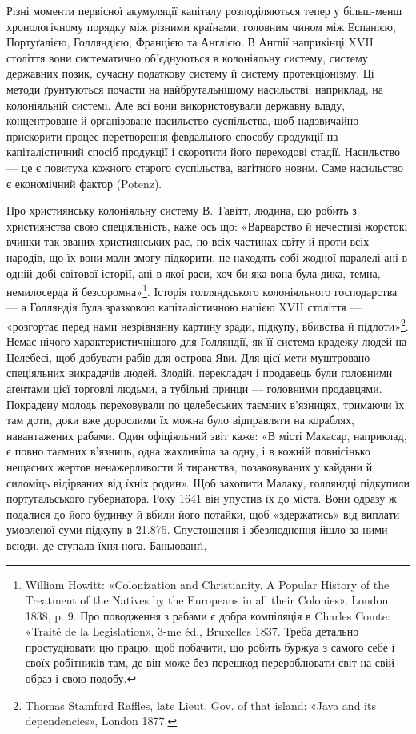 
Різні моменти первісної акумуляції капіталу розподіляються
тепер у більш-менш хронологічному порядку між різними країнами,
головним чином між Еспанією, Портуґалією, Голляндією,
Францією та Англією. В Англії наприкінці XVII століття вони
систематично об’єднуються в колоніяльну систему, систему державних
позик, сучасну податкову систему й систему протекціонізму.
Ці методи ґрунтуються почасти на найбрутальнішому
насильстві, наприклад, на колоніяльній системі. Але всі вони
використовували державну владу, концентроване й організоване
насильство суспільства, щоб надзвичайно прискорити процес
перетворення февдального способу продукції на капіталістичний
спосіб продукції і скоротити його переходові стадії. Насильство —
це є повитуха кожного старого суспільства, вагітного новим.
Саме насильство є економічний фактор (Potenz).

Про християнську колоніяльну систему В.~Гавітт, людина,
що робить з християнства свою спеціяльність, каже ось що:
«Варварство й нечестиві жорстокі вчинки так званих християнських
рас, по всіх частинах світу й проти всіх народів, що їх
вони мали змогу підкорити, не находять собі жодної паралелі
ані в одній добі світової історії, ані в якої раси, хоч би яка вона
була дика, темна, немилосерда й безсоромна»\footnote{
William Howitt: «Colonization and Christianity. A Popular History
of the Treatment of the Natives by the Europeans in all their Colonies»,
London 1838, p. 9. Про поводження з рабами є добра компіляція в Charles
Comte: «Traité de la Legislation», 3-me éd., Bruxelles 1837. Треба детально
простудіювати цю працю, щоб побачити, що робить буржуа з
самого себе і своїх робітників там, де він може без перешкод перероблювати
світ на свій образ і свою подобу.
}. Історія голляндського
колоніяльного господарства — а Голляндія була
зразковою капіталістичною нацією XVII століття — «розгортає
перед нами незрівнянну картину зради, підкупу, вбивства
й підлоти»\footnote{
Thomas Stamford Raffles, late Lieut. Gov. of that island: «Java
and its dependencies», London 1877.
}. Немає нічого характеристичнішого для Голляндії,
як її система крадежу людей на Целебесі, щоб добувати рабів
для острова Яви. Для цієї мети муштровано спеціяльних викрадачів
людей. Злодій, перекладач і продавець були головними аґентами
цієї торговлі людьми, а тубільні принци — головними продавцями.
Покрадену молодь переховували по целебеських таємних в’язницях,
тримаючи їх там доти, доки вже дорослими їх можна було
відправляти на кораблях, навантажених рабами. Один офіціяльний
звіт каже: «В місті Макасар, наприклад, є повно таємних в’язниць,
одна жахливіша за одну, і в кожній повнісінько нещасних
жертов ненажерливости й тиранства, позаковуваних у кайдани
й силоміць відірваних від їхніх родин». Щоб захопити Малаку,
голляндці підкупили португальського губернатора. Року 1641
він упустив їх до міста. Вони одразу ж подалися до його будинку
й вбили його потайки, щоб «здержатись» від виплати умовленої
суми підкупу в \num{21.875}. Спустошення і збезлюднення
йшло за ними всюди, де ступала їхня нога. Баньюванґі,
\parbreak{}  %
